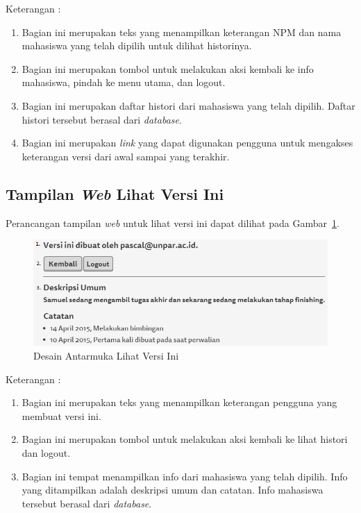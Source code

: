 Keterangan :
\begin{enumerate}[(1)]
\item
Bagian ini merupakan teks yang menampilkan keterangan NPM dan nama mahasiswa yang telah dipilih untuk dilihat historinya.
\item
Bagian ini merupakan tombol untuk melakukan aksi kembali ke info mahasiswa, pindah ke menu utama, dan logout.
\item
Bagian ini merupakan daftar histori dari mahasiswa yang telah dipilih. Daftar histori tersebut berasal dari {\it database}.
\item
Bagian ini merupakan {\it link} yang dapat digunakan pengguna untuk mengakses keterangan versi dari awal sampai yang terakhir.
\end{enumerate}

\subsection{Tampilan {\it Web} Lihat Versi Ini}
Perancangan tampilan {\it web} untuk lihat versi ini dapat dilihat pada
Gambar~\ref{fig:lihatversiini}.
\begin{figure}[ht]
\centering
\includegraphics[scale=0.8]{Gambar/lihatversiini.png}
\caption[Desain Antarmuka Lihat Versi Ini]{Desain Antarmuka Lihat Versi Ini}
\label{fig:lihatversiini}
\end{figure}

Keterangan :
\begin{enumerate}[(1)]
\item
Bagian ini merupakan teks yang menampilkan keterangan pengguna yang membuat versi ini.
\item
Bagian ini merupakan tombol untuk melakukan aksi kembali ke lihat histori dan logout.	
\item
Bagian ini tempat menampilkan info dari mahasiswa yang telah dipilih. Info yang ditampilkan adalah deskripsi umum dan catatan. Info mahasiswa tersebut berasal dari {\it database}.
\end{enumerate}

